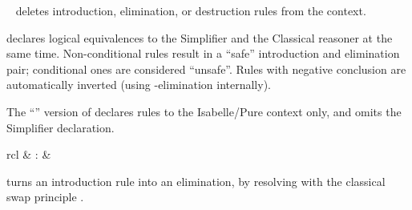 \begin{isabellebody}
\begin{isamarkuptext}
\begin{description}
  \item \hyperlink{attribute.rule}{\mbox{}}~ deletes introduction,
  elimination, or destruction rules from the context.

  \item \hyperlink{attribute.iff}{\mbox{}} declares logical equivalences to the
  Simplifier and the Classical reasoner at the same time.
  Non-conditional rules result in a ``safe'' introduction and
  elimination pair; conditional ones are considered ``unsafe''.  Rules
  with negative conclusion are automatically inverted (using -elimination internally).

  The ``'' version of \hyperlink{attribute.iff}{\mbox{}} declares rules to
  the Isabelle/Pure context only, and omits the Simplifier
  declaration.

  \end{description}%
\end{isamarkuptext}%
\isamarkuptrue%
%
\isamarkuptrue%
%
\begin{isamarkuptext}%
\begin{matharray}{rcl}
    \hypertarget{attribute.swapped}{\hyperlink{attribute.swapped}{\mbox{}}} & : &  \\
  \end{matharray}

  \begin{description}

  \item \hyperlink{attribute.swapped}{\mbox{}} turns an introduction rule into an
  elimination, by resolving with the classical swap principle .


\end{description}
\end{isamarkuptext}
\end{isabellebody}
